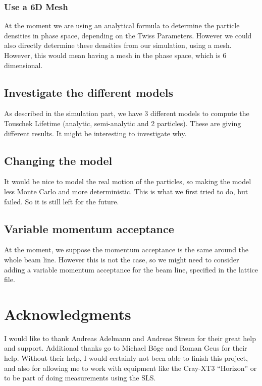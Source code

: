 \subsubsection{Use a 6D Mesh}
At the moment we are using an analytical formula to determine the particle densities in phase space, depending on the Twiss Parameters. However we could also directly determine these densities from our simulation, using a mesh. However, this would mean having a mesh in the phase space, which is 6 dimensional.

\subsection{Investigate the different models}
As described in the simulation part, we have 3 different models to compute the Touschek Lifetime (analytic, semi-analytic and 2 particles). These are giving different results. It might be interesting to investigate why.

\subsection{Changing the model}
It would be nice to model the real motion of the particles, so making the model less Monte Carlo and more deterministic. This is what we first tried to do, but failed. So it is still left for the future.

\subsection{Variable momentum acceptance}
At the moment, we suppose the momentum acceptance is the same around the whole beam line. However this is not the case, so we might need to consider adding a variable momentum acceptance for the beam line, specified in the lattice file.

\section{Acknowledgments}
I would like to thank Andreas Adelmann and Andreas Streun for their great help and support. Additional thanks go to Michael B\"oge and Roman Geus for their help. Without their help, I would certainly not been able to finish this project, and also for allowing me to work with equipment like the Cray-XT3 ``Horizon'' or to be part of doing measurements using the SLS.
